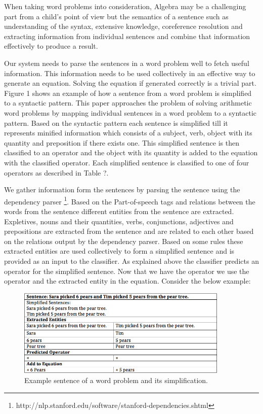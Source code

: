 \documentclass[11pt]{article}
\begin{document}
When taking word problems into consideration, Algebra may be a challenging part from a child's point of view but the semantics of a sentence such as understanding of the syntax, extensive knowledge, coreference resolution and extracting information from individual sentences and combine that information effectively to produce a result.\newline

Our system needs to parse the sentences in a word problem well to fetch useful information. This information needs to be used collectively in an effective way to generate an equation. Solving the equation if generated correctly is a trivial part. Figure 1 shows an example of how a sentence from a word problem is simplified to a syntactic pattern. This paper approaches the problem of solving arithmetic word problems by mapping individual sentences in a word problem to a syntactic pattern. Based on the syntactic pattern each sentence is simplified till it represents minified information which consists of a subject, verb, object with its quantity and preposition if there exists one. This simplified sentence is then classified to an operator and the object with its quantity is added to the equation with the classified operator. Each simplified sentence is classified to one of four operators as described in Table ?.\newline 

We gather information form the sentences by parsing the sentence using the dependency parser \footnote{http://nlp.stanford.edu/software/stanford-dependencies.shtml}. Based on the Part-of-speech tags and relations between the words from the sentence different entities from the sentence are extracted. Expletives, nouns and their quantities, verbs,  conjunctions, adjectives and prepositions are extracted from the sentence and are related to each other based on the relations output by the dependency parser. Based on some rules these extracted entities are used collectively to form a simplified sentence and is provided as an input to the classifier. As explained above the classifier predicts an operator for the simplified sentence. Now that we have the operator we use the operator and the extracted entity in the equation. Consider the below example:
\begin{figure}[h]
\includegraphics[width=0.90\textwidth]{Figure2}
\centering
\caption{\label{fig:Figure2}Example sentence of a word problem and its simplification.}
\end{figure}
\end{document}
